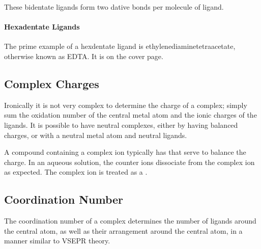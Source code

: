 			These bidentate ligands form two dative bonds per molecule of ligand.


			\pagebreak
			\paragraph{Hexadentate Ligands}

			The prime example of a hexdentate ligand is ethylenediaminetetraacetate, otherwise known as EDTA. It is on the cover page.




		\subsection{Complex Charges}

			Ironically it is not very complex to determine the charge of a complex; simply sum the oxidation number of the central metal atom and
			the ionic charges of the ligands. It is possible to have neutral complexes, either by having balanced charges, or with a neutral
			metal atom and neutral ligands.

			A compound containing a complex ion typically has  that serve to balance the charge. In an aqueous solution, the
			counter ions dissociate from the complex ion as expected. The complex ion is treated as a .



		\pagebreak
		\subsection{Coordination Number}

			The coordination number of a complex determines the number of ligands around the central atom, as well as their arrangement around
			the central atom, in a manner similar to VSEPR theory.

